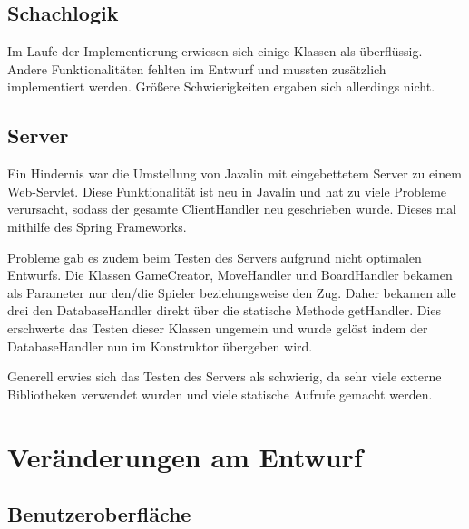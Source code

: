 \documentclass[parskip=full]{scrartcl}
\begin{document}
		\subsection{Schachlogik}
		Im Laufe der Implementierung erwiesen sich einige Klassen als überflüssig. Andere Funktionalitäten fehlten im Entwurf und mussten zusätzlich implementiert werden. Größere Schwierigkeiten ergaben sich allerdings nicht.
		
		\subsection{Server}
		Ein Hindernis war die Umstellung von Javalin mit eingebettetem Server zu einem Web-Servlet. Diese Funktionalität ist neu in Javalin und hat zu viele Probleme verursacht, sodass der gesamte ClientHandler neu geschrieben wurde.
		Dieses mal mithilfe des Spring Frameworks.	
		
		Probleme gab es zudem beim Testen des Servers aufgrund nicht optimalen Entwurfs.
		Die Klassen GameCreator, MoveHandler und BoardHandler bekamen als Parameter nur den/die Spieler beziehungsweise den Zug. Daher bekamen alle drei den DatabaseHandler direkt über die statische Methode getHandler. Dies erschwerte das Testen dieser Klassen ungemein und wurde gelöst indem der DatabaseHandler nun im Konstruktor übergeben wird.
		
		Generell erwies sich das Testen des Servers als schwierig, da sehr viele externe Bibliotheken verwendet wurden und viele statische Aufrufe gemacht werden.
		\section{Veränderungen am Entwurf}
		
		\subsection{Benutzeroberfläche}	
		
\end{document}

